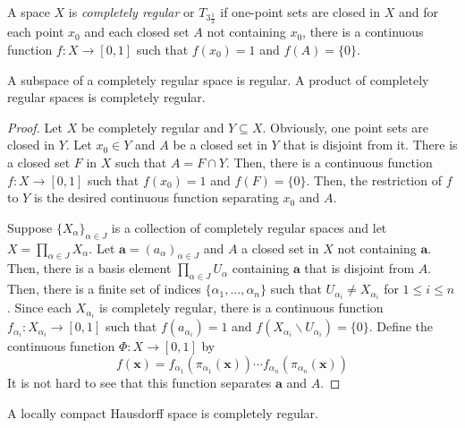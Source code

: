 \begin{definition}
    A space $X$ is \textit{completely regular} or $T_{3\frac{1}{2}}$ if one-point sets are closed in $X$ and for each point $x_0$ and each closed set $A$ not containing $x_0$, there is a continuous function $f:X\to[0,1]$ such that $f(x_0) = 1$ and $f(A) = \{0\}$.
\end{definition}

\begin{theorem}
    A subspace of a completely regular space is regular. A product of completely regular spaces is completely regular.
\end{theorem}
\begin{proof}
    Let $X$ be completely regular and $Y\subseteq X$. Obviously, one point sets are closed in $Y$. Let $x_0\in Y$ and $A$ be a closed set in $Y$ that is disjoint from it. There is a closed set $F$ in $X$ such that $A = F\cap Y$. Then, there is a continuous function $f: X\to[0,1]$ such that $f(x_0) = 1$ and $f(F) = \{0\}$. Then, the restriction of $f$ to $Y$ is the desired continuous function separating $x_0$ and $A$.

    Suppose $\{X_\alpha\}_{\alpha\in J}$ is a collection of completely regular spaces and let $X = \prod_{\alpha\in J} X_\alpha$. Let $\mathbf a = (a_\alpha)_{\alpha\in J}$ and $A$ a closed set in $X$ not containing $\mathbf a$. Then, there is a basis element $\prod_{\alpha\in J} U_\alpha$ containing $\mathbf a$ that is disjoint from $A$. Then, there is a finite set of indices $\{\alpha_1,\ldots,\alpha_n\}$ such that $U_{\alpha_i}\ne X_{\alpha_i}$ for $1\le i\le n$. Since each $X_{\alpha_i}$ is completely regular, there is a continuous function $f_{\alpha_i}: X_{\alpha_i}\to[0,1]$ such that $f(a_{\alpha_i}) = 1$ and $f(X_{\alpha_i}\backslash U_{\alpha_i}) = \{0\}$. Define the continuous function $\Phi: X\to[0,1]$ by 
    \begin{equation*}
        f(\mathbf x) = f_{\alpha_1}(\pi_{\alpha_1}(\mathbf x))\cdots f_{\alpha_n}(\pi_{\alpha_n}(\mathbf x))
    \end{equation*}
    It is not hard to see that this function separates $\mathbf a$ and $A$.
\end{proof}
\begin{corollary}
    A locally compact Hausdorff space is completely regular.
\end{corollary}

